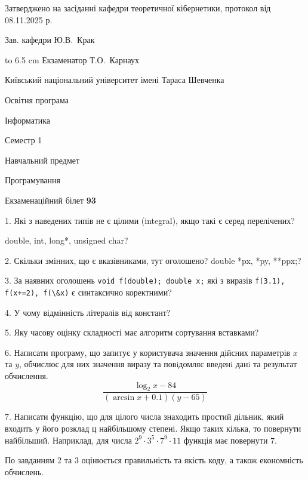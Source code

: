 \documentclass[12pt, ukrainian]{article}
\def\code#1{\Verb!#1!}
\begin{document}
{\smallskip\smallskip \begin {scriptsize} Затверджено на засіданні кафедри теоретичної кібернетики, протокол   від   08.11.2025 р.\par\smallskip\smallskip\smallskip\smallskip
{\parbox {6.5 cm} {Зав. кафедри \dotfill Ю.В.~Крак}}\hspace {0.7cm} {\hbox to 6.5 cm { Екзаменатор \dotfill Т.О.~Карнаух}} \end{scriptsize}}
\newpage
{{\begin {scriptsize}\par
{ \center  Київський національний університет імені Тараса Шевченка \par}
{\parbox {5 cm}{Освітня програма \hfill}{\parbox {7 cm}{Інформатика\hfill}}\parbox {6 cm}{\hfill Семестр 1}}\par
{\parbox {5 cm} {Навчальний предмет \hfill}\parbox {7 cm}{Програмування \hfill}\parbox {6cm}{\hfill}\par}\vspace{-15pt} \end{scriptsize}}{\center Екзаменаційний білет \No \textbf { 93 }\par}}
{%
1. Які з наведених типів не є цілими (integral), якщо такі є серед перелічених?

double, int, long*, unsigned char?
\par
\vspace{2mm}
2. Скільки змінних, що є вказівниками, тут оголошено?
double *px, *py, **ppx;?
\par
\vspace{2mm}
3. За наявних оголошень \code{void f(double); double x;} які з виразів \code{f(3.1), f(x+=2), f(\&x)} є синтаксично коректними?
\par
\vspace{2mm}
4. У чому відмінність літералів від констант?
\par
\vspace{2mm}
5. Яку часову оцінку складності має алгоритм сортування вставками?
\par
\vspace{2mm}
6. Написати програму, що запитує у користувача значення дійсних параметрів $x$ та $y$, обчислює для них значення виразу та повiдомляє введенi данi та результат обчислення.
$$\frac{\log_{2} x - 84}{(\arcsin x + 0.1) (y - 65)}$$ 

\par
7. Написати функцію, що для цілого числа знаходить простий дільник, який входить у його розклад ц найбільшому степені. Якщо таких кілька, то повернути найбільший. Наприклад, для числа $2^{9}{\cdot}3^5{\cdot}7^9{\cdot}11$ функція має повернути $7$.

По завданням 2 та 3 оцінюється правильність та якість коду, а також економність обчислень.

}
\end{document}
